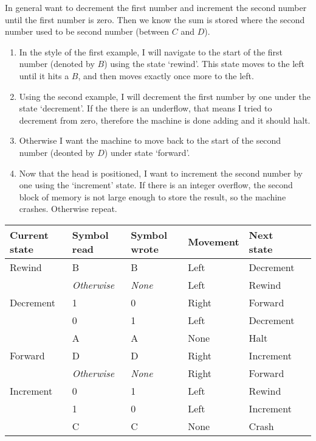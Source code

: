 \documentclass[11pt, letterpaper, twoside, openright]{book}
\begin{document}
In general want to decrement the first number and increment the second number until the first number is zero. Then we know the sum is stored where the second number used to be second number (between $C$ and $D$).

\begin{enumerate}
\item In the style of the first example, I will navigate to the start of the first number (denoted by $B$) using the state `rewind'. This state moves to the left until it hits a $B$, and then moves exactly once more to the left.

\item Using the second example, I will decrement the first number by one under the state `decrement'. If the there is an underflow, that means I tried to decrement from zero, therefore the machine is done adding and it should halt.

\item Otherwise I want the machine to move back to the start of the second number (deonted by $D$) under state `forward'.

\item Now that the head is positioned, I want to increment the second number by one using the `increment' state. If there is an integer overflow, the second block of memory is not large enough to store the result, so the machine crashes. Otherwise repeat.
\end{enumerate}

\begin{tabular}{|l|l|l|l|l|l|}
\hline
Current state & Symbol read & Symbol wrote & Movement & Next state \\
\hline
Rewind & B & B & Left & Decrement \\
 & \textit{Otherwise} & \textit{None} & Left & Rewind \\
\hline
Decrement & 1 & 0 & Right & Forward \\
 & 0 & 1 & Left & Decrement \\
 & A & A & None & Halt \\
\hline
Forward & D & D & Right & Increment \\
 & \textit{Otherwise} & \textit{None} & Right & Forward \\
\hline
Increment & 0 & 1 & Left & Rewind \\
 & 1 & 0 & Left & Increment \\
 & C & C & None & Crash \\
\hline
\end{tabular}
\end{document}
